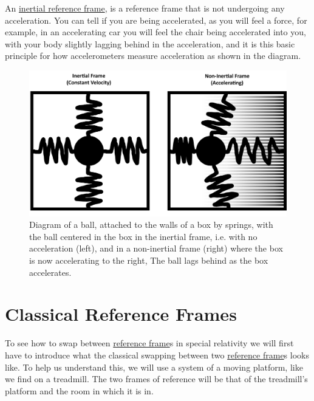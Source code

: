 An \hyperlink{def-Inertial-reference-frame}{inertial reference frame}, is a reference frame that is not undergoing any acceleration. You can tell if you are being accelerated, as you will feel a force, for example, in an accelerating car you will feel the chair being accelerated into you, with your body slightly lagging behind in the acceleration, and it is this basic principle for how accelerometers measure acceleration as shown in the diagram.

\begin{figure}[H]
	\centering
	\includegraphics[width=\textwidth]{images/pdf/Spring_boxes.pdf}
	\caption{Diagram of a ball, attached to the walls of a box by springs, with the ball centered in the box in the inertial frame, i.e. with no acceleration (left), and in a non-inertial frame (right) where the box is now accelerating to the right, The ball lags behind as the box accelerates.}
	\label{fig: spring boxes}
\end{figure}

\section{Classical Reference Frames}

To see how to swap between \hyperlink{def-Reference-frame}{reference frame}s in special relativity we will first have to introduce what the classical swapping between two \hyperlink{def-Reference-frame}{reference frame}s looks like. To help us understand this, we will use a system of a moving platform, like we find on a treadmill. The two frames of reference will be that of the treadmill's platform and the room in which it is in.

